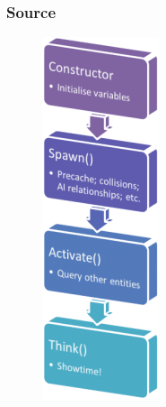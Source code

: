 \documentclass[a4paper, 12pt]{scrartcl}
\begin{document}
\subsubsection{Source}
\begin{figure}
  \centering
  \includegraphics[width=\linewidth]{images/source_entity_flow.png}
\end{figure}
\end{document}
